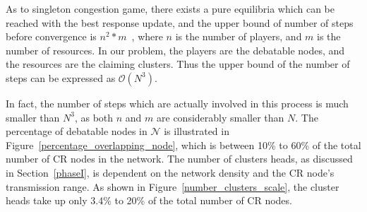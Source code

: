 \documentclass[10pt,journal,compsoc]{IEEEtran}
\theoremstyle{mytheoremstyle}
\theoremstyle{mytheoremstyle}
\theoremstyle{mytheoremstyle}
\begin{document}
As to singleton congestion game, there exists a pure equilibria which can be reached with the best response update, and the upper bound of number of steps before convergence is $n^2*m$~\cite{Ackermann06purenash}, where $n$ is the number of players, and $m$ is the number of resources.
In our problem, the players are the debatable nodes, and the resources are the claiming clusters.
Thus the upper bound of the number of steps can be expressed as $\mathcal{O}(N^3)$.

In fact, the number of steps which are actually involved in this process is much smaller than $N^3$, as both $n$ and $m$ are considerably smaller than $N$.
The percentage of debatable nodes in $\mathcal{N}$ is illustrated in Figure~\ref{percentage_overlapping_node}, which is between 10\% to 60\% of the total number of CR nodes in the network.
The number of clusters heads, as discussed in Section~\ref{phaseI}, is dependent on the network density and the CR node's transmission range.
As shown in Figure~\ref{number_clusters_scale}, the cluster heads take up only 3.4\% to 20\% of the total number of CR nodes.



\end{document}
